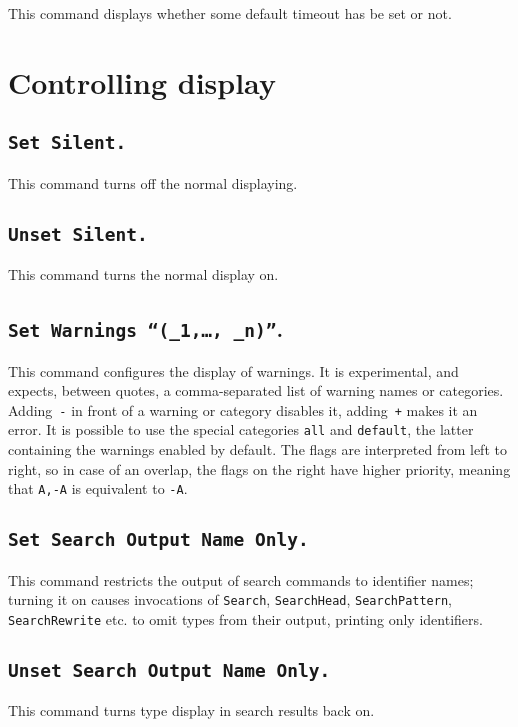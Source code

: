 This command displays whether some default timeout has be set or not.

\section{Controlling display}

\subsection[\tt Set Silent.]{\tt Set Silent.
\label{Begin-Silent}
}
This command turns off the normal displaying.

\subsection[\tt Unset Silent.]{\tt Unset Silent.}
This command turns the normal display on.

\subsection[\tt Set Warnings ``(\nterm{w}$_1$,\ldots,%
  \nterm{w}$_n$)''.]{{\tt Set Warnings ``($_1$,\ldots,%
  $_n$)''}.}
\label{SetWarnings}
This command configures the display of warnings. It is experimental, and
expects, between quotes, a comma-separated list of warning names or
categories. Adding~\texttt{-} in front of a warning or category disables it,
adding~\texttt{+} makes it an error. It is possible to use the special
categories \texttt{all} and \texttt{default}, the latter containing the warnings
enabled by default. The flags are interpreted from left to right, so in case of
an overlap, the flags on the right have higher priority, meaning that
\texttt{A,-A} is equivalent to \texttt{-A}.

\subsection[\tt Set Search Output Name Only.]{\tt Set Search Output Name Only.
\label{Search-Output-Name-Only}
}
This command restricts the output of search commands to identifier names; turning it on causes invocations of {\tt Search}, {\tt SearchHead}, {\tt SearchPattern}, {\tt SearchRewrite} etc. to omit types from their output, printing only identifiers.

\subsection[\tt Unset Search Output Name Only.]{\tt Unset Search Output Name Only.}
This command turns type display in search results back on.

